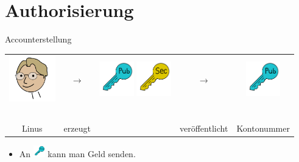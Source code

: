 \documentclass[aspectratio=169]{beamer}
\begin{document}
\section{Authorisierung}

\begin{frame}{Accounterstellung}
    \begin{center}
        \begin{tabular}{ccccc}
            \includegraphics[width=2cm]{../icons/Linus} & {\Huge$\longrightarrow$} & \includegraphics[width=1.5cm]{../icons/PubKey} \hspace*{-0.5cm} \includegraphics[width=1.5cm]{../icons/SecKey} & {\Huge$\longrightarrow$} & \includegraphics[width=1.5cm]{../icons/PubKey}\\~\\
            Linus & erzeugt & & veröffentlicht & Kontonummer\\
        \end{tabular}
    \end{center}
    \vspace{1cm}
    \begin{itemize}
        \item An \includegraphics[width=0.5cm]{../icons/PubKey} kann man Geld senden.
    \end{itemize}
\end{frame}
\end{document}
